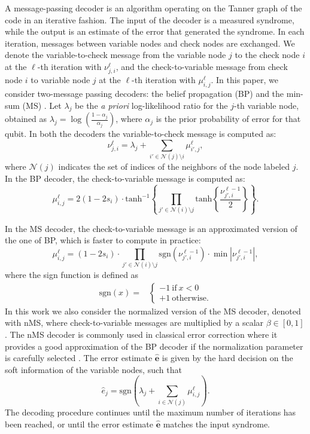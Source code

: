 \documentclass[a4paper,twocolumn,11pt,accepted=2026-05-03]{quantumarticle}
\begin{document}
A message-passing decoder is an algorithm operating on the Tanner graph of the code in an iterative fashion. The input of the decoder is a measured syndrome, while the output is an estimate of the error that generated the syndrome. In each iteration, messages between variable nodes and check nodes are exchanged. We denote the variable-to-check message from the variable node $j$ to the check node $i$ at the $\ell$-th iteration with $\nu_{j,i}^{\ell}$, and the check-to-variable message from check node $i$ to variable node $j$ at the $\ell$-th iteration with $\mu_{i,j}^{\ell}$. In this paper, we consider two-message passing decoders: the belief propagation (BP) \cite{sum-product} and the min-sum (MS) \cite{nms_decoder}. Let $\lambda_j$ be the \textit{a priori} log-likelihood ratio for the $j$-th variable node, obtained as $\lambda_j = \log (\frac{1-\alpha_j}{\alpha_j})$, where $\alpha_j$ is the prior probability of error for that qubit. In both the decoders the variable-to-check message is computed as:
\begin{equation}
    \nu_{j,i}^{\ell} = \lambda_j + \sum_{i' \in \mathcal{N}(j)\setminus i} \mu_{i',j}^{\ell},
\end{equation}
where $\mathcal N(j)$ indicates the set of indices of the neighbors of the node labeled $j$.
In the BP decoder, the check-to-variable message is computed as:
{\smaller
\begin{equation}
    \mu_{i,j}^{\ell} = 2(1-2s_i)\cdot \mathrm{tanh}^{-1}\left\{\prod_{j' \in \mathcal{N}(i) \setminus j} \mathrm{tanh}\left\{\frac{\nu_{j',i}^{\ell-1}}{2}\right\}\right \}.
\end{equation}
}

In the MS decoder, the check-to-variable message is an approximated version of the one of BP, which is faster to compute in practice:
\begin{equation}
    \mu_{i,j}^{\ell} = (1-2s_i)\cdot \prod_{j' \in \mathcal{N}(i) \setminus j} \mathrm{sgn}(\nu_{j',i}^{\ell-1})\cdot  \min |\nu_{j',i}^{\ell-1}|,
\end{equation}
where the sign function is defined as
\begin{align}
    \mathrm{sgn}(x) = & \begin{cases}
        -1\ \mathrm{if}\ x<0\\
        +1\ \mathrm{otherwise}.
    \end{cases}
\end{align}
In this work we also consider the normalized version of the MS decoder, denoted with nMS, where check-to-variable messages are multiplied by a scalar $\beta \in [0,1]$. The nMS decoder is commonly used in classical error correction where it provides a good approximation of the BP decoder if the normalization parameter is carefully selected \cite{nms_decoder}. The error estimate $\hat{\mathbf{e}}$ is given by the hard decision on the soft information of the variable nodes, such that
\begin{equation}
    \hat{e}_j = \mathrm{sgn}\left(\lambda_j + \sum_{i \in \mathcal{N}(j)} \mu_{i,j}^{\ell} \right).
\end{equation}
The decoding procedure continues until the maximum number of iterations has been reached, or until the error estimate $\hat{\mathbf{e}}$ matches the input syndrome.
\end{document}
